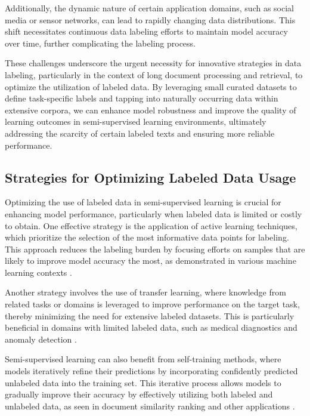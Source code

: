 Additionally, the dynamic nature of certain application domains, such as social media or sensor networks, can lead to rapidly changing data distributions. This shift necessitates continuous data labeling efforts to maintain model accuracy over time, further complicating the labeling process.



These challenges underscore the urgent necessity for innovative strategies in data labeling, particularly in the context of long document processing and retrieval, to optimize the utilization of labeled data. By leveraging small curated datasets to define task-specific labels and tapping into naturally occurring data within extensive corpora, we can enhance model robustness and improve the quality of learning outcomes in semi-supervised learning environments, ultimately addressing the scarcity of certain labeled texts and ensuring more reliable performance. \cite{ginzburg2021selfsuperviseddocumentsimilarityranking,shu2017fakenewsdetectionsocial,gao2023benefitslabeldescriptiontrainingzeroshot}



\subsection{Strategies for Optimizing Labeled Data Usage} \label{subsec:Strategies for Optimizing Labeled Data Usage}

Optimizing the use of labeled data in semi-supervised learning is crucial for enhancing model performance, particularly when labeled data is limited or costly to obtain. One effective strategy is the application of active learning techniques, which prioritize the selection of the most informative data points for labeling. This approach reduces the labeling burden by focusing efforts on samples that are likely to improve model accuracy the most, as demonstrated in various machine learning contexts \cite{sen2018supervisingfeatureinfluence}.



Another strategy involves the use of transfer learning, where knowledge from related tasks or domains is leveraged to improve performance on the target task, thereby minimizing the need for extensive labeled datasets. This is particularly beneficial in domains with limited labeled data, such as medical diagnostics and anomaly detection .



Semi-supervised learning can also benefit from self-training methods, where models iteratively refine their predictions by incorporating confidently predicted unlabeled data into the training set. This iterative process allows models to gradually improve their accuracy by effectively utilizing both labeled and unlabeled data, as seen in document similarity ranking and other applications \cite{ginzburg2021selfsuperviseddocumentsimilarityranking}.



